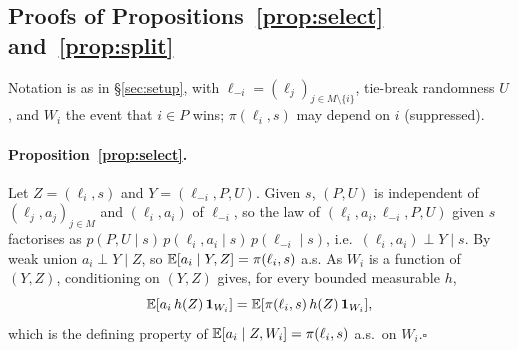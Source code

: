 
\subsection{Proofs of Propositions~\ref{prop:select} and~\ref{prop:split}}
\label{sec:app-proofs}

Notation is as in \S\ref{sec:setup}, with $\ell_{-i}=(\ell_j)_{j\in M\setminus\{i\}}$,
tie-break randomness $U$, and $W_i$ the event that $i\in P$ wins; $\pi(\ell_i,s)$ may depend on
$i$ (suppressed).

\paragraph{Proposition~\ref{prop:select}.}
Let $Z=(\ell_i,s)$ and $Y=(\ell_{-i},P,U)$. Given $s$, $(P,U)$ is independent of
$(\ell_j,a_j)_{j\in M}$ and $(\ell_i,a_i)$ of $\ell_{-i}$, so the law of
$(\ell_i,a_i,\ell_{-i},P,U)$ given $s$ factorises as
$p(P,U\mid s)\,p(\ell_i,a_i\mid s)\,p(\ell_{-i}\mid s)$, i.e.\ $(\ell_i,a_i)\perp Y\mid s$.
By weak union $a_i\perp Y\mid Z$, so $\mathbb{E}[a_i\mid Y,Z]=\pi(\ell_i,s)$ a.s. As $W_i$ is a function
of $(Y,Z)$, conditioning on $(Y,Z)$ gives, for every bounded measurable $h$,
\begin{equation}
  \mathbb{E}[a_i\,h(Z)\,\mathbf{1}_{W_i}] = \mathbb{E}[\pi(\ell_i,s)\,h(Z)\,\mathbf{1}_{W_i}],
  \label{eq:app-display}
\end{equation}
which is the defining property of $\mathbb{E}[a_i\mid Z,W_i]=\pi(\ell_i,s)$ a.s.\ on $W_i$.\hfill$\square$

